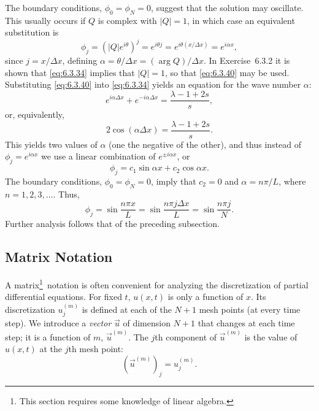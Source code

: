 The boundary conditions, $\phi_0 = \phi_N = 0$, suggest that the solution may oscillate.  This usually occurs if $Q$ is complex with $|Q| = 1$, in which case an equivalent substitution is
\begin{equation}
\phi_j = (|Q|e^{i\theta})^j = e^{i\theta j} = e^{i\theta(x/\Delta x)} = e^{i\alpha x},
\label{eq:6.3.40}
\end{equation}
since $j = x/\Delta x$, defining $\alpha = \theta/\Delta x = (\arg Q)/\Delta x$.  In Exercise~6.3.2 it is shown that \eqref{eq:6.3.34} implies that $|Q| = 1$, so that \eqref{eq:6.3.40} may be used.  Substituting \eqref{eq:6.3.40} into \eqref{eq:6.3.34} yields an equation for the wave number $\alpha$:
\[
e^{i\alpha\Delta x} + e^{-i\alpha\Delta x} = \frac{\lambda - 1 + 2s}{s},
\]
or, equivalently,
\begin{equation}
\boxed{2\cos(\alpha\Delta x) = \frac{\lambda - 1 + 2s}{s}.}
\label{eq:6.3.41}
\end{equation}
This yields two values of $\alpha$ (one the negative of the other), and thus instead of $\phi_j = e^{i\alpha x}$ we use a linear combination of $e^{\pm i\alpha x}$, or
\begin{equation}
\phi_j = c_1\sin\alpha x + c_2\cos\alpha x.
\label{eq:6.3.42}
\end{equation}
The boundary conditions, $\phi_0 = \phi_N = 0$, imply that $c_2 = 0$ and $\alpha = n\pi/L$, where $n = 1, 2, 3, \ldots$\@.  Thus,
\begin{equation}
\boxed{\phi_j = \sin\frac{n\pi x}{L} = \sin\frac{n\pi j\Delta x}{L} = \sin\frac{n\pi j}{N}.}
\label{eq:6.3.43}
\end{equation}
Further analysis follows that of the preceding subsection.

\subsection{Matrix Notation}
\label{sec:fd-heat-matrix}

A matrix\footnote{This section requires some knowledge of linear algebra.}\ notation is often convenient for analyzing the discretization of partial differential equations.  For fixed $t$, $u(x,t)$ is only a function of $x$.  Its discretization $u_j^{(m)}$ is defined at each of the $N+1$ mesh points (at every time step).  We introduce a \emph{vector} $\vec{u}$ of dimension $N+1$ that changes at each time step; it is a function of $m$, $\vec{u}^{(m)}$.  The $j$th component of $\vec{u}^{(m)}$ is the value of $u(x,t)$ at the $j$th mesh point:
\begin{equation}
\left(\vec{u}^{(m)}\right)_j = u_j^{(m)}.
\label{eq:6.3.44}
\end{equation}

